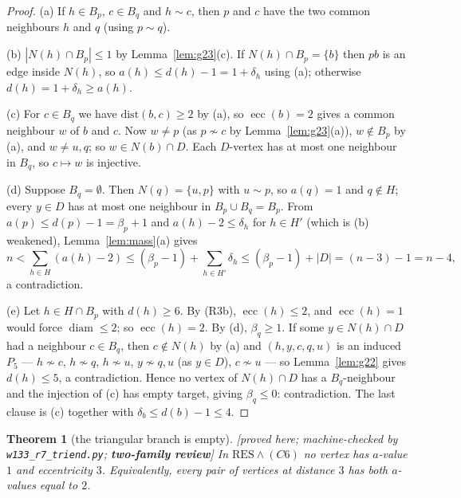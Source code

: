 \documentclass[11pt]{article}
\theoremstyle{plain}
\newtheorem{theorem}{Theorem}[section]
\theoremstyle{definition}
\theoremstyle{remark}
\numberwithin{equation}{section}
\newcommand{\ecc}{\operatorname{ecc}}
\newcommand{\diam}{\operatorname{diam}}
\newcommand{\statusbox}[1]{{\small\sloppy\textsf{[#1]}}}
\newcommand{\REV}[1]{\statusbox{proved here; machine-checked by \texttt{#1};
\textbf{two-family review}}}
\begin{document}
\begin{proof}
(a) If $h \in B_p$, $c \in B_q$ and $h \sim c$, then $p$ and $c$ have the two common
neighbours $h$ and $q$ (using $p \sim q$).

(b) $|N(h)\cap B_p| \le 1$ by Lemma~\ref{lem:g23}(c). If $N(h)\cap B_p = \{b\}$ then $pb$ is
an edge inside $N(h)$, so $a(h)\le d(h)-1 = 1 + \delta_h$ using (a); otherwise
$d(h) = 1 + \delta_h \ge a(h)$.

(c) For $c \in B_q$ we have $\mathrm{dist}(b,c) \ge 2$ by (a), so $\ecc(b) = 2$ gives a
common neighbour $w$ of $b$ and $c$. Now $w \ne p$ (as $p \not\sim c$ by
Lemma~\ref{lem:g23}(a)), $w \notin B_p$ by (a), and $w \ne u,q$; so $w \in N(b)\cap D$. Each
$D$-vertex has at most one neighbour in $B_q$, so $c \mapsto w$ is injective.

(d) Suppose $B_q = \emptyset$. Then $N(q) = \{u,p\}$ with $u \sim p$, so $a(q) = 1$ and
$q \notin H$; every $y \in D$ has at most one neighbour in $B_p \cup B_q = B_p$. From
$a(p) \le d(p)-1 = \beta_p + 1$ and $a(h) - 2 \le \delta_h$ for $h \in H'$ (which is (b)
weakened), Lemma~\ref{lem:mass}(a) gives
\[
  n < \sum_{h\in H}(a(h)-2) \le (\beta_p - 1) + \sum_{h\in H'}\delta_h
    \le (\beta_p-1) + |D| = (n-3)-1 = n-4,
\]
a contradiction.

(e) Let $h \in H\cap B_p$ with $d(h)\ge 6$. By (R3b), $\ecc(h) \le 2$, and $\ecc(h) = 1$
would force $\diam \le 2$; so $\ecc(h) = 2$. By (d), $\beta_q \ge 1$. If some
$y \in N(h)\cap D$ had a neighbour $c \in B_q$, then $c \notin N(h)$ by (a) and
$(h,y,c,q,u)$ is an induced $P_5$ --- $h \not\sim c$, $h \not\sim q$, $h \not\sim u$,
$y \not\sim q, u$ (as $y \in D$), $c \not\sim u$ --- so Lemma~\ref{lem:g22} gives
$d(h)\le 5$, a contradiction. Hence no vertex of $N(h)\cap D$ has a $B_q$-neighbour and the
injection of (c) has empty target, giving $\beta_q \le 0$: contradiction. The last clause is
(c) together with $\delta_b \le d(b) - 1 \le 4$.
\end{proof}

\begin{theorem}[the triangular branch is empty]\label{thm:g26}
\REV{w133\_r7\_triend.py}
In $\mathrm{RES} \wedge (C6)$ no vertex has $a$-value $1$ and eccentricity $3$. Equivalently,
every pair of vertices at distance $3$ has both $a$-values equal to $2$.
\end{theorem}
\end{document}
